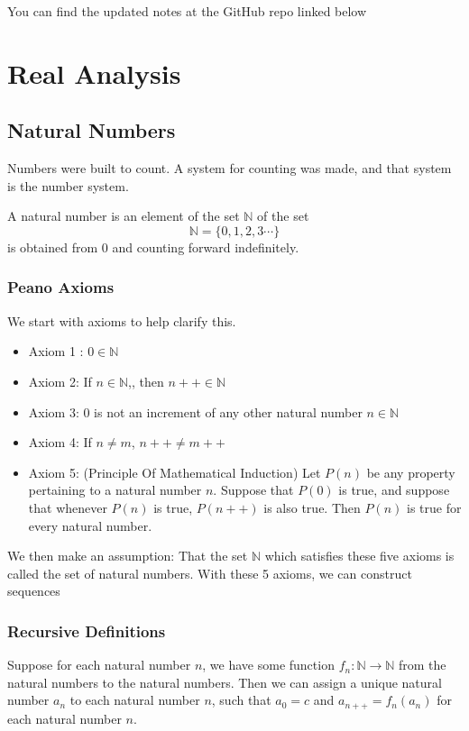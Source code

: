 \documentclass[11pt]{report}
\begin{document}
You can find the updated notes at the GitHub repo linked below

\part{Real Analysis}
\chapter{Natural Numbers}
Numbers were built to count. A system for counting was made, and that system is the number system.
\begin{definition}
	A natural number is an element of the set $\mathbb{N}$ of the set
	\[
		\mathbb{N} = \{0,1,2,3\cdots \}
	\]
	is obtained from 0 and counting forward indefinitely.
\end{definition}
\section{Peano Axioms}

We start with axioms to help clarify this.
\begin{itemize}
	\item Axiom 1 : \(0 \in \mathbb{N}\)
	\item Axiom 2: If \(n \in \mathbb{N}\),, then \(n++ \in \mathbb{N}\)
	\item Axiom 3: 0 is not an increment of any other natural number \(n \in \mathbb{N}\)
	\item Axiom 4: If \(n \neq m\), \(n++ \neq m++\)
	\item Axiom 5: (Principle Of Mathematical Induction) Let \(P(n)\) be any property pertaining to a natural number \(n\). Suppose that \(P(0)\) is true, and suppose that whenever \(P(n)\) is true, \(P(n++)\) is also true. Then \(P(n)\) is true for every natural number.
\end{itemize}

We then make an assumption: That the set \(\mathbb{N}\) which satisfies these five axioms is called the set of natural numbers.
With these 5 axioms, we can construct sequences

\section{Recursive Definitions}

\begin{prop}
	Suppose for each natural number $n$, we have some function $f_n:\mathbb{N} \rightarrow \mathbb{N}$ from the natural numbers to the natural numbers. Then we can assign a unique natural number $a_n$ to each natural number $n$, such that $a_0 = c$ and $a_{n++} = f_n(a_n)$ for each natural number $n$.
\end{prop}
\end{document}
